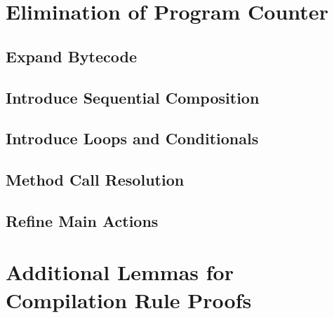 \section{Elimination of Program Counter}

\subsection{Expand Bytecode}



\pagebreak

\subsection{Introduce Sequential Composition}



\pagebreak

\subsection{Introduce Loops and Conditionals}



\pagebreak

\subsection{Method Call Resolution}



\pagebreak

\subsection{Refine Main Actions}



\pagebreak

\section{Additional Lemmas for Compilation Rule Proofs}

